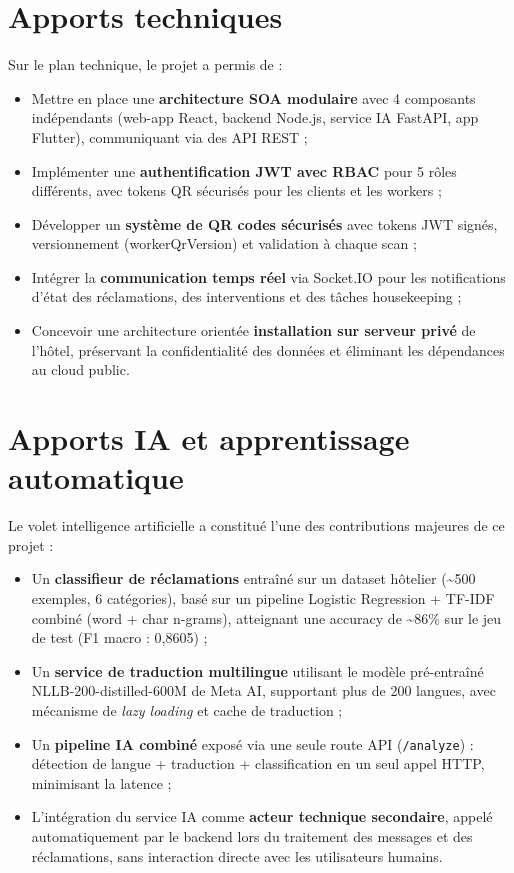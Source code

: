 \section*{Apports techniques}

Sur le plan technique, le projet a permis de :

\begin{itemize}
  \item Mettre en place une \textbf{architecture SOA modulaire} avec 4 composants indépendants (web-app React, backend Node.js, service IA FastAPI, app Flutter), communiquant via des API REST ;
  \item Implémenter une \textbf{authentification JWT avec RBAC} pour 5 rôles différents, avec tokens QR sécurisés pour les clients et les workers ;
  \item Développer un \textbf{système de QR codes sécurisés} avec tokens JWT signés, versionnement (workerQrVersion) et validation à chaque scan ;
  \item Intégrer la \textbf{communication temps réel} via Socket.IO pour les notifications d'état des réclamations, des interventions et des tâches housekeeping ;
  \item Concevoir une architecture orientée \textbf{installation sur serveur privé} de l'hôtel, préservant la confidentialité des données et éliminant les dépendances au cloud public.
\end{itemize}

\section*{Apports IA et apprentissage automatique}

Le volet intelligence artificielle a constitué l'une des contributions majeures de ce projet :

\begin{itemize}
  \item Un \textbf{classifieur de réclamations} entraîné sur un dataset hôtelier (\textasciitilde{}500 exemples, 6 catégories), basé sur un pipeline Logistic Regression + TF-IDF combiné (word + char n-grams), atteignant une accuracy de \textasciitilde{}86\% sur le jeu de test (F1 macro : 0,8605) ;
  \item Un \textbf{service de traduction multilingue} utilisant le modèle pré-entraîné NLLB-200-distilled-600M de Meta AI, supportant plus de 200 langues, avec mécanisme de \textit{lazy loading} et cache de traduction ;
  \item Un \textbf{pipeline IA combiné} exposé via une seule route API (\texttt{/analyze}) : détection de langue + traduction + classification en un seul appel HTTP, minimisant la latence ;
  \item L'intégration du service IA comme \textbf{acteur technique secondaire}, appelé automatiquement par le backend lors du traitement des messages et des réclamations, sans interaction directe avec les utilisateurs humains.
\end{itemize}

